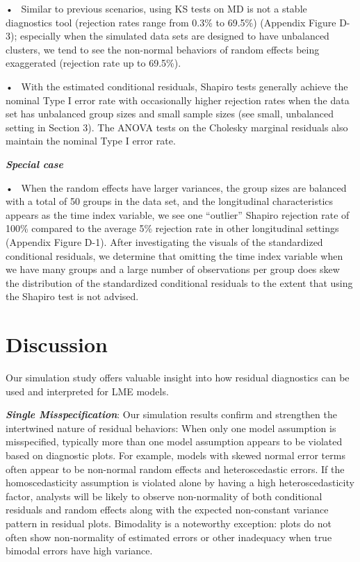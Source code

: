 \documentclass[12pt]{article}
\begin{document}
• ~Similar to previous scenarios, using KS tests on MD is not a stable
diagnostics tool (rejection rates range from 0.3\% to 69.5\%) (Appendix
Figure D-3); especially when the simulated data sets are designed to
have unbalanced clusters, we tend to see the non-normal behaviors of
random effects being exaggerated (rejection rate up to 69.5\%).

• ~With the estimated conditional residuals, Shapiro tests generally
achieve the nominal Type I error rate with occasionally higher rejection
rates when the data set has unbalanced group sizes and small sample
sizes (see small, unbalanced setting in Section 3). The ANOVA tests on
the Cholesky marginal residuals also maintain the nominal Type I error
rate.

\textbf{\emph{Special case}}

• ~When the random effects have larger variances, the group sizes are
balanced with a total of 50 groups in the data set, and the longitudinal
characteristics appears as the time index variable, we see one
``outlier'' Shapiro rejection rate of 100\% compared to the average 5\%
rejection rate in other longitudinal settings (Appendix Figure D-1).
After investigating the visuals of the standardized conditional
residuals, we determine that omitting the time index variable when we
have many groups and a large number of observations per group does skew
the distribution of the standardized conditional residuals to the extent
that using the Shapiro test is not advised.

\section{Discussion}

Our simulation study offers valuable insight into how residual
diagnostics can be used and interpreted for LME models.

\textbf{\emph{Single Misspecification}}: Our simulation results confirm
and strengthen the intertwined nature of residual behaviors: When only
one model assumption is misspecified, typically more than one model
assumption appears to be violated based on diagnostic plots. For
example, models with skewed normal error terms often appear to be
non-normal random effects and heteroscedastic errors. If the
homoscedasticity assumption is violated alone by having a high
heteroscedasticity factor, analysts will be likely to observe
non-normality of both conditional residuals and random effects along
with the expected non-constant variance pattern in residual plots.
Bimodality is a noteworthy exception: plots do not often show
non-normality of estimated errors or other inadequacy when true bimodal
errors have high variance.
\end{document}
